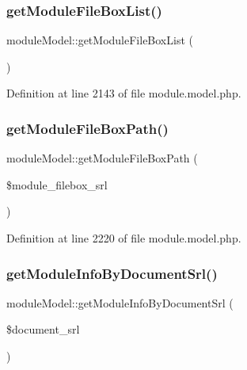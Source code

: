 \subsubsection{\texorpdfstring{get\+Module\+File\+Box\+List()}{getModuleFileBoxList()}}
{\footnotesize\ttfamily module\+Model\+::get\+Module\+File\+Box\+List (\begin{DoxyParamCaption}{ }\end{DoxyParamCaption})}



Definition at line 2143 of file module.\+model.\+php.

\hypertarget{classmoduleModel_ac1183d568d6dab443a83c8618e6eb348}{}\label{classmoduleModel_ac1183d568d6dab443a83c8618e6eb348} 
\subsubsection{\texorpdfstring{get\+Module\+File\+Box\+Path()}{getModuleFileBoxPath()}}
{\footnotesize\ttfamily module\+Model\+::get\+Module\+File\+Box\+Path (\begin{DoxyParamCaption}\item[{}]{\$module\+\_\+filebox\+\_\+srl }\end{DoxyParamCaption})}



Definition at line 2220 of file module.\+model.\+php.

\hypertarget{classmoduleModel_a6b3ba81393e32a934f7bff65f05663d5}{}\label{classmoduleModel_a6b3ba81393e32a934f7bff65f05663d5} 
\subsubsection{\texorpdfstring{get\+Module\+Info\+By\+Document\+Srl()}{getModuleInfoByDocumentSrl()}}
{\footnotesize\ttfamily module\+Model\+::get\+Module\+Info\+By\+Document\+Srl (\begin{DoxyParamCaption}\item[{}]{\$document\+\_\+srl }\end{DoxyParamCaption})}



